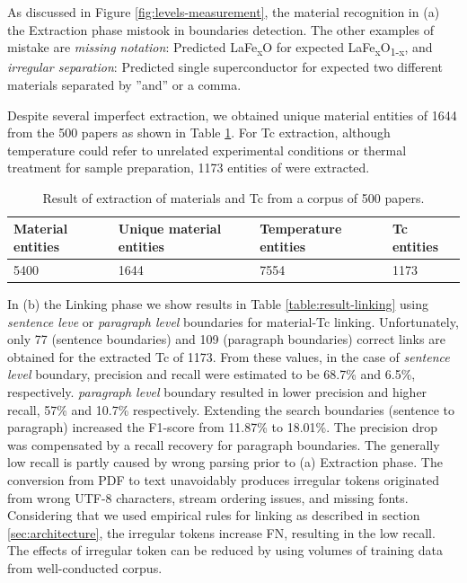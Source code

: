 \documentclass{article}[a4]
\begin{document}
As discussed in Figure \ref{fig:levels-measurement}, the material recognition in (a) the Extraction phase mistook in boundaries detection. The other examples of mistake are \textit{missing notation}: Predicted LaFe\textsubscript{x}O for expected LaFe\textsubscript{x}O\textsubscript{1-x}, and \textit{irregular separation}: Predicted single superconductor for expected two different materials separated by ”and” or a comma. 

Despite several imperfect extraction, we obtained unique material entities of 1644 from the 500 papers as shown in Table \ref{table:result-extraction}. For Tc extraction, although temperature could refer to unrelated experimental conditions or thermal treatment for sample preparation, 1173 entities of were extracted.

\begin{table}[h!]
    \centering
    \begin{tabular}{ | m{4em} | m{4em} | m{6em} | m{5em} | } 
    \hline
        Material entities & Unique material entities & Temperature entities & Tc entities \\
    \hline
        5400 & 1644 & 7554 & 1173 \\ 
    \hline
    \end{tabular}
    \label{table:result-extraction}
    \caption{Result of extraction of materials and Tc from a corpus of 500 papers.}    
\end{table}

In (b) the Linking phase we show results in Table \ref{table:result-linking} using \textit{sentence leve} or \textit{paragraph level} boundaries for material-Tc linking. Unfortunately, only 77 (sentence boundaries) and 109 (paragraph boundaries) correct links are obtained for the extracted Tc of 1173. From these values, in the case of \textit{sentence level} boundary, precision and recall were estimated to be 68.7\% and 6.5\%, respectively. \textit{paragraph level} boundary resulted in lower precision and higher recall, 57\% and 10.7\% respectively. Extending the search boundaries (sentence to paragraph) increased the F1-score from 11.87\% to 18.01\%. The precision drop was compensated by a recall recovery for paragraph boundaries. 
The generally low recall is partly caused by wrong parsing prior to (a) Extraction phase. The conversion from PDF to text unavoidably produces irregular tokens originated from wrong UTF-8 characters, stream ordering issues, and missing fonts.  Considering that we used empirical rules for linking as described in section \ref{sec:architecture}, the irregular tokens increase FN, resulting in the low recall. The effects of irregular token can be reduced by using volumes of training data from well-conducted corpus.
\end{document}
